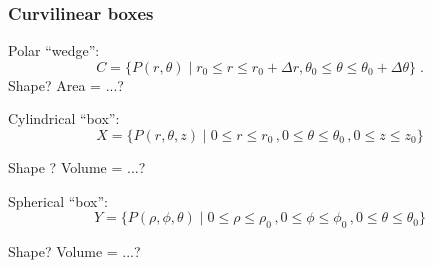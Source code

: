 \begin{frame}
 \frametitle{Curvilinear boxes}
 
 Polar ``wedge'':
$$C  = \{ P(r,\theta) \; | \;r_0 \leqslant
r \leqslant r_0+\Delta r,  \theta_0 \leqslant \theta
\leqslant \theta_0+\Delta \theta\} \; .$$
%
Shape? \pause Area = ...?
\pause

\bigskip

Cylindrical ``box'':
%
$$X = \{ P(r,\theta, z) \; | \; 0 \leqslant r \leqslant r_0\, ,
0 \leqslant \theta \leqslant \theta_0\, ,
0 \leqslant z \leqslant z_0\}$$

\pause
Shape ? \pause Volume = ...?

\bigskip

\pause
Spherical ``box'':
%
$$Y = \{ P(\rho, \phi, \theta) \; | \; 0 \leqslant \rho \leqslant \rho_0\, ,
0 \leqslant \phi \leqslant \phi_0\, ,
0 \leqslant \theta \leqslant \theta_0\}$$

\pause
Shape? \pause Volume = ...?

\end{frame}